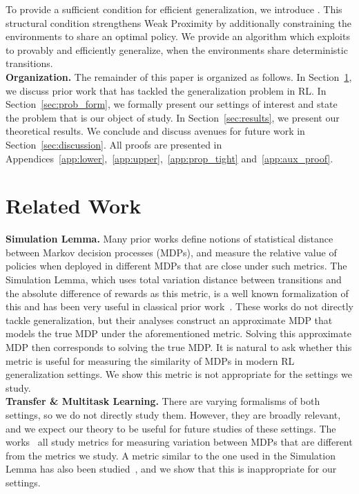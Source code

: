 \documentclass[11pt,twoside]{article}
\begin{document}
To provide a sufficient condition for efficient generalization, we introduce \emph{\strprox{}}. This structural condition strengthens Weak Proximity by additionally constraining the environments to share an optimal policy. We provide an algorithm which exploits \strprox{} to provably and efficiently generalize, when the environments share deterministic transitions. \\

\noindent \textbf{Organization.} The remainder of this paper is organized as follows. In Section~\ref{sec:related_work}, we discuss prior work that has tackled the generalization problem in RL. In Section~\ref{sec:prob_form}, we formally present our settings of interest and state the problem that is our object of study. In Section~\ref{sec:results}, we present our theoretical results. We conclude and discuss avenues for future work in Section~\ref{sec:discussion}. All proofs are presented in Appendices~\ref{app:lower},~\ref{app:upper},~\ref{app:prop_tight} and~\ref{app:aux_proof}.


\section{Related Work}
\label{sec:related_work}
\noindent \textbf{Simulation Lemma.} Many prior works define notions of statistical distance between Markov decision processes (MDPs), and measure the relative value of policies when deployed in different MDPs that are close under such metrics. The Simulation Lemma, which uses total variation distance between transitions and the absolute difference of rewards as this metric, is a well known formalization of this and has been very useful in classical prior work~\citep{kearns99, kearns02, brafman03, kakade03, abbeel05}. These works do not directly tackle generalization, but their analyses construct an approximate MDP that models the true MDP under the aforementioned metric. Solving this approximate MDP then corresponds to solving the true MDP. It is natural to ask whether this metric is useful for measuring the similarity of MDPs in modern RL generalization settings. We show this metric is not appropriate for the settings we study. \\

\noindent \textbf{Transfer \& Multitask Learning.} There are varying formalisms of both settings, so we do not directly study them. However, they are broadly relevant, and we expect our theory to be useful for future studies of these settings. The works~\citep{lazaric10, brunskill13, jiang18, wang19} all study metrics for measuring variation between MDPs that are different from the metrics we study. A metric similar to the one used in the Simulation Lemma has also been studied~\citep{feng19}, and we show that this is inappropriate for our settings. \\
\end{document}
